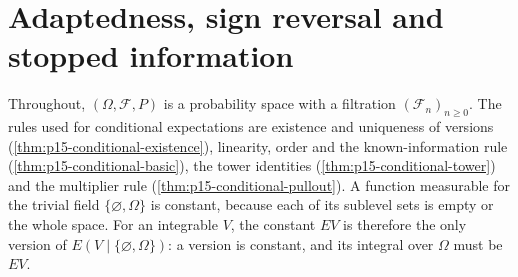 \section{Adaptedness, sign reversal and stopped information}
\label{sec:annex-p15-w02c-p15-019}

Throughout, \((\Omega,\mathcal F,P)\) is a probability space with a
filtration \((\mathcal F_n)_{n\geq0}\). The rules used for conditional
expectations are existence and uniqueness of versions
(\cref{thm:p15-conditional-existence}), linearity, order and the
known-information rule (\cref{thm:p15-conditional-basic}), the tower
identities (\cref{thm:p15-conditional-tower}) and the multiplier rule
(\cref{thm:p15-conditional-pullout}). A function measurable for the trivial field
\(\{\varnothing,\Omega\}\) is constant, because each of its sublevel
sets is empty or the whole space. For an integrable \(V\), the constant
\(EV\) is therefore the only version of
\(E(V\mid\{\varnothing,\Omega\})\): a version is constant, and its
integral over \(\Omega\) must be \(EV\).

